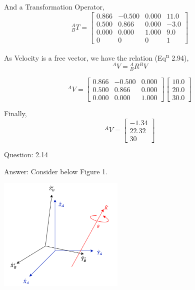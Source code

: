 \documentclass[a4paper]{article}
\begin{document}
\begin{qalist}
			And a Transformation Operator, 
			\begin{equation}
				{}^{A}_{B}{T} = 
				\left[ \begin{matrix}
					0.866 & -0.500 &  0.000 & 11.0\\
					0.500 & 0.866 & 0.000 & -3.0\\
					0.000 & 0.000 & 1.000 & 9.0\\
					0 & 0 & 0 & 1
				\end{matrix} \right]
			\end{equation}
			
			As Velocity is a free vector, we have the relation (Eq\textsuperscript{n} 2.94), 
			\begin{equation}
				{}^{A}{V} = {}^{A}_{B}{R} {}^{B}{V}
			\end{equation}
			
			\begin{equation}
				{}^{A}{V} = \left[ \begin{matrix}
					0.866 & -0.500 &  0.000 \\
					0.500 & 0.866 & 0.000 \\
					0.000 & 0.000 & 1.000 
				\end{matrix} \right]
				\left[ \begin{matrix}
					10.0 \\
					20.0 \\
					30.0
				\end{matrix} \right]
			\end{equation}
			
			Finally,
			\begin{equation}
				{}^{A}{V} = 
				\left[ \begin{matrix}
					-1.34 \\
					22.32 \\
					30
				\end{matrix} \right]
			\end{equation}
			
		\item[Question: 2.14] \setcounter{equation}{0} 
		\item[Answer:]		
			Consider below Figure 1. \\
			\begin{minipage}{\linewidth}
				\centering
				\includegraphics[width=0.45\textwidth]{2_14_Figure.drawio.png}
				\vspace{0.5cm}
			\end{minipage}
			

\end{qalist}
\end{document}

